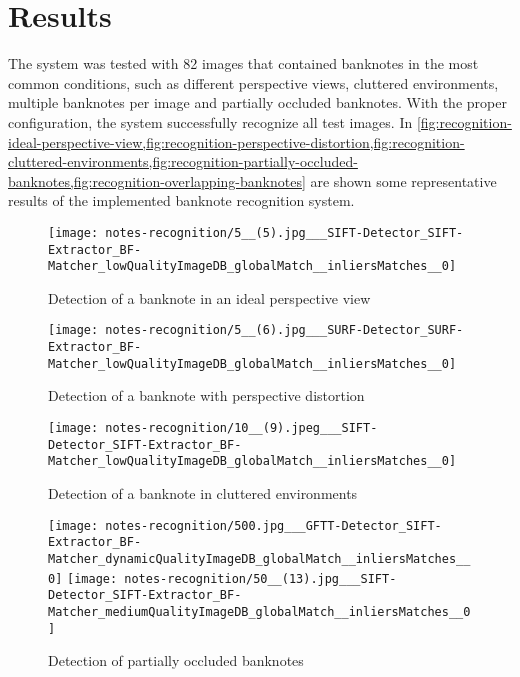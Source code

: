 \section{Results}\label{sec:results}

The system was tested with 82 images that contained banknotes in the most common conditions, such as different perspective views, cluttered environments, multiple banknotes per image and partially occluded banknotes. With the proper configuration, the system successfully recognize all test images. In \cref{fig:recognition-ideal-perspective-view,fig:recognition-perspective-distortion,fig:recognition-cluttered-environments,fig:recognition-partially-occluded-banknotes,fig:recognition-overlapping-banknotes} are shown some representative results of the implemented banknote recognition system.

\begin{figure}[H]
	\centering
	\texttt{[image: notes-recognition/5\_\_(5).jpg\_\_\_SIFT-Detector\_SIFT-Extractor\_BF-Matcher\_lowQualityImageDB\_globalMatch\_\_inliersMatches\_\_0]}
	\caption{Detection of a banknote in an ideal perspective view}
	\label{fig:recognition-ideal-perspective-view}
\end{figure}

\begin{figure}[H]
	\centering
	\texttt{[image: notes-recognition/5\_\_(6).jpg\_\_\_SURF-Detector\_SURF-Extractor\_BF-Matcher\_lowQualityImageDB\_globalMatch\_\_inliersMatches\_\_0]}
	\caption{Detection of a banknote with perspective distortion}
	\label{fig:recognition-perspective-distortion}
\end{figure}

\begin{figure}[H]
	\centering
	\texttt{[image: notes-recognition/10\_\_(9).jpeg\_\_\_SIFT-Detector\_SIFT-Extractor\_BF-Matcher\_lowQualityImageDB\_globalMatch\_\_inliersMatches\_\_0]}
	\caption{Detection of a banknote in cluttered environments}
	\label{fig:recognition-cluttered-environments}
\end{figure}

\begin{figure}[H]
	\centering
	\texttt{[image: notes-recognition/500.jpg\_\_\_GFTT-Detector\_SIFT-Extractor\_BF-Matcher\_dynamicQualityImageDB\_globalMatch\_\_inliersMatches\_\_0]}
	\texttt{[image: notes-recognition/50\_\_(13).jpg\_\_\_SIFT-Detector\_SIFT-Extractor\_BF-Matcher\_mediumQualityImageDB\_globalMatch\_\_inliersMatches\_\_0]}
	\caption{Detection of partially occluded banknotes}
	\label{fig:recognition-partially-occluded-banknotes}
\end{figure}

